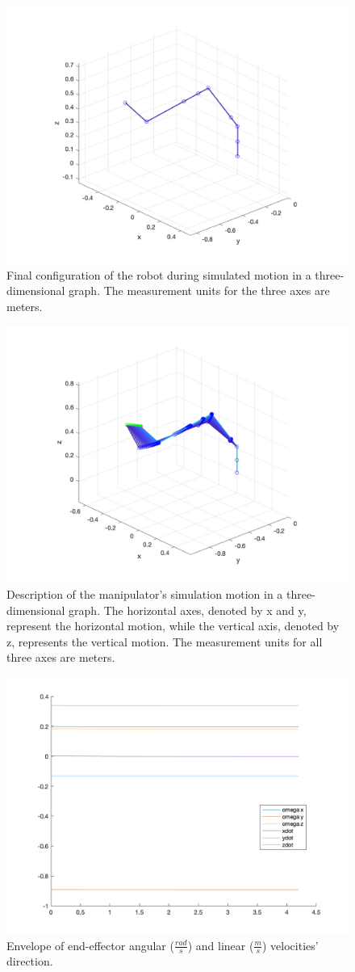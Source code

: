 \begin{figure}
	\centering
	\includegraphics[width=0.7\linewidth]{Resources/FinalConfiguration}
	\caption{Final configuration of the robot during simulated motion in a three-dimensional graph. The measurement units for the three axes are meters.}
	\label{fig:finalconfiguration}
\end{figure}
\begin{figure}
	\centering
	\includegraphics[width=0.7\linewidth]{Resources/MotionOfTheManipulator}
	\caption{ Description of the manipulator’s simulation motion in a three-dimensional graph. The horizontal axes, denoted by x and y, represent the horizontal motion, while the vertical axis, denoted by z, represents the vertical motion. The measurement units for all three axes are meters.}
	\label{fig:motionofthemanipulator}
\end{figure}
\begin{figure}
	\centering
	\includegraphics[width=0.7\linewidth]{Resources/DirectionVelocitiesEE}
	\caption{Envelope of end-effector angular ($\frac{rad}{s}$) and linear ($\frac{m}{s}$) velocities' direction.}
	\label{fig:directionvelocitiesee}
\end{figure}
